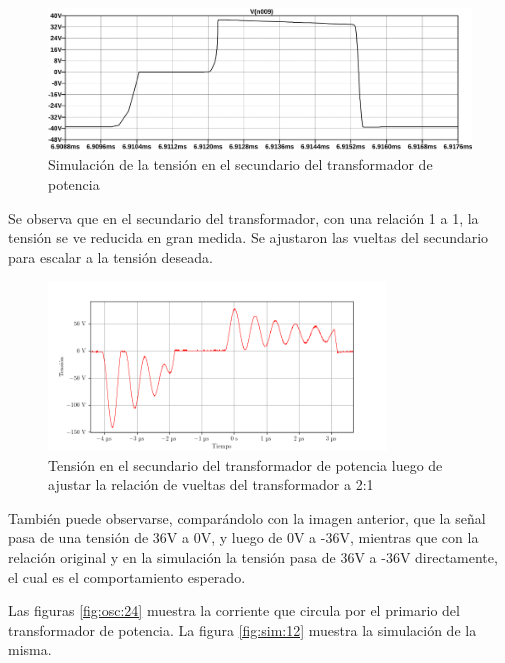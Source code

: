 \begin{figure}[H]
    \centering
    \includegraphics[width=\textwidth]{images/sim/20.pdf}
    \caption{Simulación de la tensión en el secundario del transformador de potencia}
    \label{fig:sim:20}
\end{figure}

Se observa que en el secundario del transformador, con una relación 1 a 1,
la tensión se ve reducida en gran medida.
Se ajustaron las vueltas del secundario para escalar a la tensión deseada.

\begin{figure}[H]
    \centering
    \includegraphics[width=0.8\textwidth]{images/capturas-osciloscopio/17-11-2022/56.png}
    \caption{Tensión en el secundario del transformador de potencia luego de ajustar la relación de vueltas del transformador a 2:1}
    \label{fig:osc:41}
\end{figure}

También puede observarse, comparándolo con la imagen anterior, que la señal pasa de una tensión de 36V a 0V,
y luego de 0V a -36V, mientras que con la relación original y en la simulación la tensión pasa de 36V a -36V directamente,
el cual es el comportamiento esperado.


Las figuras \ref{fig:osc:24} muestra la corriente que circula por el primario del transformador de potencia. La figura \ref{fig:sim:12} muestra la simulación de la misma.

